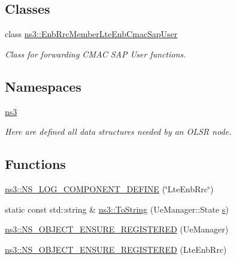 \subsection*{Classes}
\begin{DoxyCompactItemize}
\item 
class \hyperlink{classns3_1_1EnbRrcMemberLteEnbCmacSapUser}{ns3\+::\+Enb\+Rrc\+Member\+Lte\+Enb\+Cmac\+Sap\+User}
\begin{DoxyCompactList}\small\item\em Class for forwarding C\+M\+AC S\+AP User functions. \end{DoxyCompactList}\end{DoxyCompactItemize}
\subsection*{Namespaces}
\begin{DoxyCompactItemize}
\item 
 \hyperlink{namespacens3}{ns3}
\begin{DoxyCompactList}\small\item\em Here are defined all data structures needed by an O\+L\+SR node. \end{DoxyCompactList}\end{DoxyCompactItemize}
\subsection*{Functions}
\begin{DoxyCompactItemize}
\item 
\hyperlink{namespacens3_ae50c971c2f05766ed8c94ab666d3eddc}{ns3\+::\+N\+S\+\_\+\+L\+O\+G\+\_\+\+C\+O\+M\+P\+O\+N\+E\+N\+T\+\_\+\+D\+E\+F\+I\+NE} (\char`\"{}Lte\+Enb\+Rrc\char`\"{})
\item 
static const std\+::string \& \hyperlink{namespacens3_a00d29d365ff8deb7a0dab96ade3b19ea}{ns3\+::\+To\+String} (Ue\+Manager\+::\+State \hyperlink{generate__test__data__lte__sinr_8m_ad83eeb3a142285d1243a08c6b7026df8}{s})
\item 
\hyperlink{namespacens3_a657d18e86fb2d90cff66500ce0f0f47f}{ns3\+::\+N\+S\+\_\+\+O\+B\+J\+E\+C\+T\+\_\+\+E\+N\+S\+U\+R\+E\+\_\+\+R\+E\+G\+I\+S\+T\+E\+R\+ED} (Ue\+Manager)
\item 
\hyperlink{namespacens3_ae79b6d6ebf70bed8db613e4fdf08f6d0}{ns3\+::\+N\+S\+\_\+\+O\+B\+J\+E\+C\+T\+\_\+\+E\+N\+S\+U\+R\+E\+\_\+\+R\+E\+G\+I\+S\+T\+E\+R\+ED} (Lte\+Enb\+Rrc)
\end{DoxyCompactItemize}
